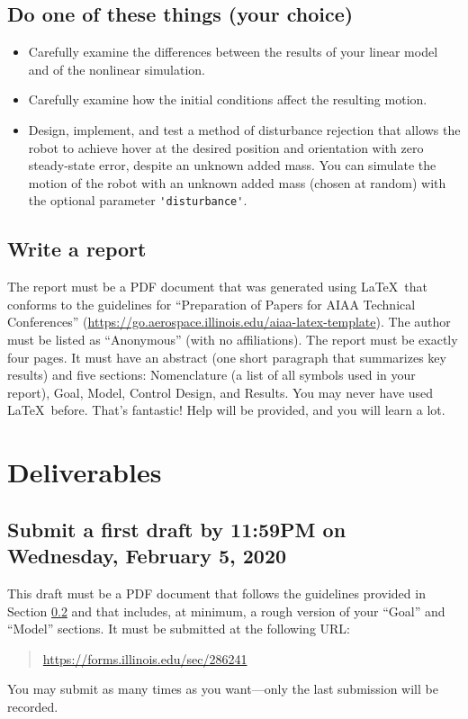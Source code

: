 \documentclass[conf]{new-aiaa}
\begin{document}
\subsection{Do one of these things (your choice)}

\begin{itemize}

\item Carefully examine the differences between the results of your linear model and of the nonlinear simulation.
\item Carefully examine how the initial conditions affect the resulting motion.
\item Design, implement, and test a method of disturbance rejection that allows the robot to achieve hover at the desired position and orientation with zero steady-state error, despite an unknown added mass. You can simulate the motion of the robot with an unknown added mass (chosen at random) with the optional parameter \lstinline|'disturbance'|.

\end{itemize}

\subsection{Write a report}
\label{report}

The report must be a PDF document that was generated using \LaTeX\, that conforms to the guidelines for ``Preparation of Papers for AIAA Technical Conferences'' (\url{https://go.aerospace.illinois.edu/aiaa-latex-template}). The author must be listed as ``Anonymous'' (with no affiliations). The report must be exactly four pages. It must have an abstract (one short paragraph that summarizes key results) and five sections: Nomenclature (a list of all symbols used in your report), Goal, Model, Control Design, and Results. You may never have used \LaTeX\ before. That's fantastic! Help will be provided, and you will learn a lot.


\section{Deliverables}

\subsection{Submit a first draft by 11:59PM on Wednesday, February 5, 2020}

This draft must be a PDF document that follows the guidelines provided in Section \ref{report} and that includes, at minimum, a rough version of your ``Goal'' and ``Model'' sections. It must be submitted at the following URL:
\begin{quote}
\url{https://forms.illinois.edu/sec/286241}
\end{quote}
You may submit as many times as you want---only the last submission will be recorded.
\end{document}
